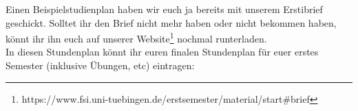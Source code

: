 Einen Beispielstudienplan haben wir euch ja bereits mit unserem Erstibrief geschickt. Solltet ihr den Brief nicht mehr haben oder nicht bekommen haben, könnt ihr ihn euch auf unserer Website\footnote{https://www.fsi.uni-tuebingen.de/erstsemester/material/start\#brief} nochmal runterladen.\\
In diesen Stundenplan könnt ihr euren finalen Stundenplan für euer erstes Semester (inklusive Übungen, etc) eintragen:

\vfill


